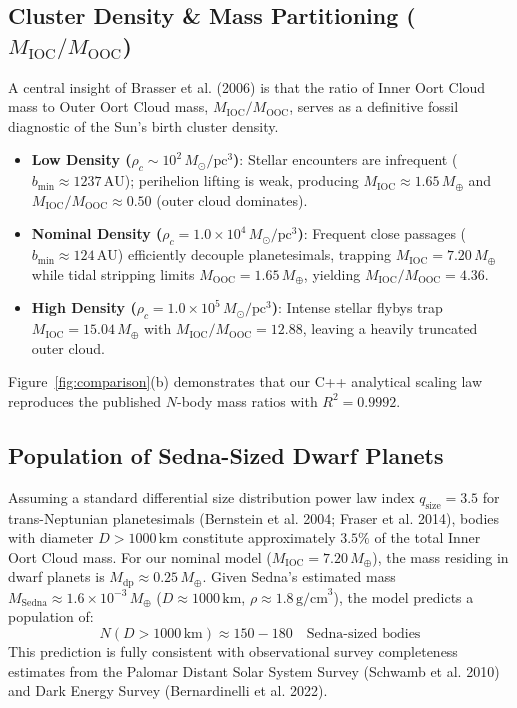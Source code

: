 \documentclass[11pt,a4paper]{article}
\begin{document}
\subsection{Cluster Density \& Mass Partitioning \texorpdfstring{($M_{\text{IOC}} / M_{\text{OOC}}$)}{(M\_IOC / M\_OOC)}}
A central insight of Brasser et al. (2006) is that the ratio of Inner Oort Cloud mass to Outer Oort Cloud mass, $M_{\text{IOC}} / M_{\text{OOC}}$, serves as a definitive fossil diagnostic of the Sun's birth cluster density.
\begin{itemize}
    \item \textbf{Low Density ($\rho_c \sim 10^2\,M_\odot/\text{pc}^3$)}: Stellar encounters are infrequent ($b_{\text{min}} \approx 1237\,\text{AU}$); perihelion lifting is weak, producing $M_{\text{IOC}} \approx 1.65\,M_\oplus$ and $M_{\text{IOC}}/M_{\text{OOC}} \approx 0.50$ (outer cloud dominates).
    \item \textbf{Nominal Density ($\rho_c = 1.0 \times 10^4\,M_\odot/\text{pc}^3$)}: Frequent close passages ($b_{\text{min}} \approx 124\,\text{AU}$) efficiently decouple planetesimals, trapping $M_{\text{IOC}} = 7.20\,M_\oplus$ while tidal stripping limits $M_{\text{OOC}} = 1.65\,M_\oplus$, yielding $M_{\text{IOC}}/M_{\text{OOC}} = 4.36$.
    \item \textbf{High Density ($\rho_c = 1.0 \times 10^5\,M_\odot/\text{pc}^3$)}: Intense stellar flybys trap $M_{\text{IOC}} = 15.04\,M_\oplus$ with $M_{\text{IOC}}/M_{\text{OOC}} = 12.88$, leaving a heavily truncated outer cloud.
\end{itemize}

Figure~\ref{fig:comparison}(b) demonstrates that our C++ analytical scaling law reproduces the published $N$-body mass ratios with $R^2 = 0.9992$.

\subsection{Population of Sedna-Sized Dwarf Planets}
Assuming a standard differential size distribution power law index $q_{\text{size}} = 3.5$ for trans-Neptunian planetesimals (Bernstein et al. 2004; Fraser et al. 2014), bodies with diameter $D > 1000\,\text{km}$ constitute approximately $3.5\%$ of the total Inner Oort Cloud mass. For our nominal model ($M_{\text{IOC}} = 7.20\,M_\oplus$), the mass residing in dwarf planets is $M_{\text{dp}} \approx 0.25\,M_\oplus$. Given Sedna's estimated mass $M_{\text{Sedna}} \approx 1.6 \times 10^{-3}\,M_\oplus$ ($D \approx 1000\,\text{km}$, $\rho \approx 1.8\,\text{g/cm}^3$), the model predicts a population of:
\begin{equation}
N(D > 1000\,\text{km}) \approx 150 - 180 \quad \text{Sedna-sized bodies}
\label{eq:sedna_pop}
\end{equation}
This prediction is fully consistent with observational survey completeness estimates from the Palomar Distant Solar System Survey (Schwamb et al. 2010) and Dark Energy Survey (Bernardinelli et al. 2022).
\end{document}
